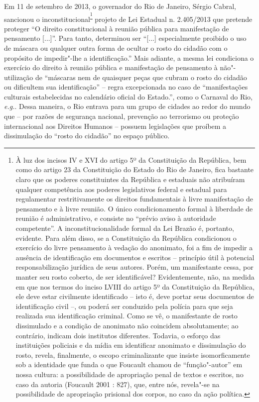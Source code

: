 Em 11 de setembro de 2013, o governador do Rio de Janeiro, Sérgio
Cabral, sancionou o inconstitucional\textsuperscript{\footnote{À luz dos
  incisos IV e XVI do artigo 5º da Constituição da República, bem como
  do artigo 23 da Constituição do Estado do Rio de Janeiro, fica
  bastante claro que os poderes constituintes da República e estaduais
  não atribuíram qualquer competência aos poderes legislativos federal e
  estadual para regulamentar restritivamente os direitos fundamentais à
  livre manifestação de pensamento e à livre reunião. O único
  condicionamento formal à liberdade de reunião é administrativo, e
  consiste no ``prévio aviso à autoridade competente''. A
  inconstitucionalidade formal da Lei Brazão é, portanto, evidente. Para
  além disso, se a Constituição da República condicionou o exercício do
  livre pensamento à vedação do anonimato, foi a fim de impedir a
  ausência de identificação em documentos e escritos -- princípio útil à
  potencial responsabilização jurídica de seus autores. Porém, um
  manifestante cessa, por manter seu rosto coberto, de ser
  identificável? Evidentemente, não, na medida em que nos termos do
  inciso LVIII do artigo 5º da Constituição da República, ele deve estar
  civilmente identificado -- isto é, deve portar seus documentos de
  identificação civil --, ou poderá ser conduzido pela polícia para que
  seja realizada sua identificação criminal. Como se vê, o manifestante
  de rosto dissimulado e a condição de anonimato não coincidem
  absolutamente; ao contrário, indicam dois institutos diferentes.
  Todavia, o esforço das instituições policiais e da mídia em
  identificar anonimato e dissimulação do rosto, revela, finalmente, o
  escopo criminalizante que insiste isomorficamente sob a identidade que
  funda o que Foucault chamou de ``função"-autor'' em nossa cultura: a
  possibilidade de apropriação penal de textos e escritos, no caso da
  autoria (Foucault 2001 : 827), que, entre nós, revela"-se na
  possibilidade de apropriação prisional dos corpos, no caso da ação
  política.}} projeto de Lei Estadual n. 2.405/2013 que pretende
proteger ``O direito constitucional à reunião pública para manifestação
de pensamento {[}...{]}''. Para tanto, determinou ser ``{[}...{]}
especialmente proibido o uso de máscara ou qualquer outra forma de
ocultar o rosto do cidadão com o propósito de impedir"-lhe a
identificação.'' Mais adiante, a mesma lei condiciona o exercício do
direito à reunião pública e manifestação de pensamento à não"-utilização
de ``máscaras nem de quaisquer peças que cubram o rosto do cidadão ou
dificultem sua identificação'' -- regra excepcionada no caso de
``manifestações culturais estabelecidas no calendário oficial do
Estado.'', como o Carnaval do Rio, \emph{e.g.}. Dessa maneira, o Rio
entrava para um grupo de cidades ao redor do mundo que -- por razões de
segurança nacional, prevenção ao terrorismo ou proteção internacional
aos Direitos Humanos -- possuem legislações que proíbem a dissimulação
do ``rosto do cidadão'' no espaço público.

